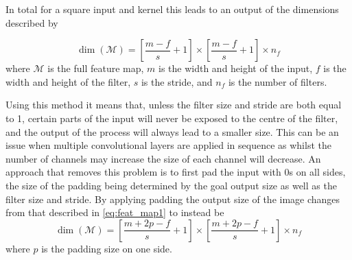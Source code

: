\documentclass[12pt]{article}
\numberwithin{equation}{section}
\numberwithin{figure}{section}
\begin{document}
In total for a square input and kernel this leads to an output of the dimensions described by

\begin{equation}
	\label{eq:feat_map1}
	\dim(\mathscr{M}) = \left[\frac{m-f}{s} +1 \right] \times \left[\frac{m-f}{s} +1 \right] \times n_{f}
\end{equation}
where $\mathscr{M}$ is the full feature map, $m$ is the width and height of the input, $f$ is the width and height of the filter, $s$ is the stride, and $n_f$ is the number of filters.

Using this method it means that, unless the filter size and stride are both equal to 1, certain parts of the input will never be exposed to the centre of the filter, and the output of the process will always lead to a smaller size. This can be an issue when multiple convolutional layers are applied in sequence as whilst the number of channels may increase the size of each channel will decrease. An approach that removes this problem is to first pad the input with 0s on all sides, the size of the padding being determined by the goal output size as well as the filter size and stride. By applying padding the output size of the image changes from that described in \cref{eq:feat_map1} to instead be
\begin{equation}
	\label{eq:feat_map2}
	\dim(\mathscr{M}) = \left[\frac{m+2p-f}{s} +1 \right] \times \left[\frac{m+2p-f}{s} +1 \right] \times n_{f}
\end{equation}
where $p$ is the padding size on one side.
\end{document}
